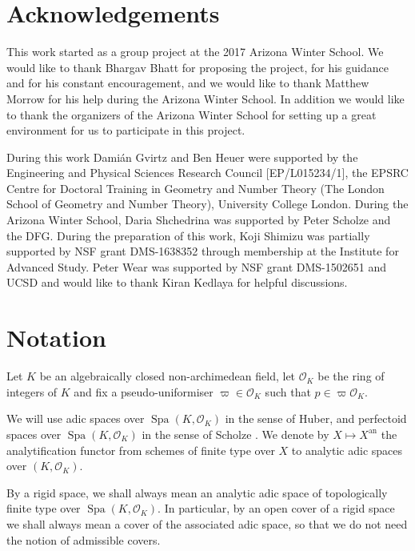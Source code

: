 \documentclass[10pt,oneside]{amsart}
\theoremstyle{definition}
\newcommand{\an}{\mathrm{an}}
\renewcommand{\O}{\mathcal{O}}
\begin{document}
 
 
 \section*{Acknowledgements}
 This work started as a group project at the 2017 Arizona Winter School. We would like to thank Bhargav Bhatt for proposing the project, for his guidance and for his constant encouragement, and we would like to thank Matthew Morrow for his help during the Arizona Winter School. In addition we would like to thank the organizers of the Arizona Winter School for setting up a great environment for us to participate in this project. 
 
 During this work Dami\'an Gvirtz and Ben Heuer were supported by the Engineering and Physical Sciences Research Council [EP/L015234/1], the EPSRC Centre for Doctoral Training in Geometry and Number Theory (The London School of Geometry and Number Theory), University College London. 
 During the Arizona Winter School, Daria Shchedrina was supported by Peter Scholze and the DFG.
During the preparation of this work, Koji Shimizu was partially supported by NSF grant DMS-1638352 through membership at the Institute for Advanced Study.
 Peter Wear was supported by NSF grant DMS-1502651 and UCSD and would like to thank Kiran Kedlaya for helpful discussions.


\section*{Notation}
	Let $K$ be an algebraically closed non-archimedean field, let $\mathcal O_K$ be the ring of integers of $K$ and fix a pseudo-uniformiser $\varpi\in \mathcal O_K$ such that $p\in\varpi\mathcal O_K$. 
	
	We will use adic spaces over $\operatorname{Spa}(K,\O_K)$ in the sense of Huber, and perfectoid spaces over $\operatorname{Spa}(K,\O_K)$ in the sense of Scholze \cite{perfectoid}. We denote by $X\mapsto X^{\an}$ the analytification functor from schemes of finite type over $X$ to analytic adic spaces over $(K,\O_K)$.
	
	By a rigid space, we shall always mean an analytic adic space of topologically finite type over $\operatorname{Spa}(K,\mathcal O_K)$. 
	In particular, by an open cover of a rigid space we shall always mean a cover of the associated adic space, so that we do not need the notion of admissible covers.
	
\end{document}
